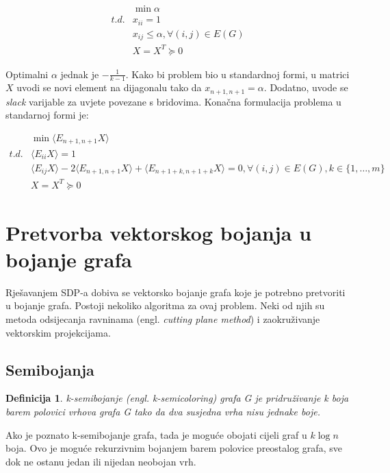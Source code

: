 \documentclass[diplomskirad]{fer}
\newtheorem{definicija}{Definicija}
\begin{document}
\begin{equation} \label{eq:color_notstandard}
  \begin{split}
    & \min \alpha \\
    t.d. & x_{ii} = 1 \\
         & x_{ij} \leq \alpha, \forall (i,j) \in E(G) \\
         & X=X^T \succeq 0 
  \end{split}
\end{equation}

Optimalni $\alpha$ jednak je $-\frac{1}{k-1}$. Kako bi problem bio u standardnoj formi, u matrici $X$ uvodi se novi element na dijagonalu tako da
$x_{n+1,n+1} = \alpha$. Dodatno, uvode se \textit{slack} varijable za uvjete povezane s bridovima. Konačna formulacija problema u standarnoj formi je: 


\begin{equation} \label{sdpbojanje}
  \begin{split}
    & \min \langle E_{n+1,n+1}X \rangle \\
    t.d. & \langle E_{ii}X \rangle = 1 \\
         & \langle E_{ij}X \rangle - 2 \langle E_{n+1,n+1}X \rangle + \langle E_{n+1+k,n+1+k}X \rangle = 0, \forall (i,j) \in E(G), k \in \{1,\dots,m\} \\
         & X=X^T \succeq 0 
  \end{split}
\end{equation}

\section{Pretvorba vektorskog bojanja u bojanje grafa}
Rješavanjem SDP-a dobiva se vektorsko bojanje grafa koje je potrebno pretvoriti u bojanje grafa. Postoji nekoliko algoritma za ovaj problem. Neki od njih su metoda odsijecanja ravninama 
(engl. \textit{cutting plane method}) i zaokruživanje vektorskim projekcijama.

\subsection{Semibojanja}
\begin{definicija}
  k-semibojanje (engl. \textit{k-semicoloring}) grafa G je pridruživanje k boja barem polovici vrhova grafa G tako da dva susjedna vrha nisu jednake boje. 
\end{definicija}

Ako je poznato k-semibojanje grafa, tada je moguće obojati cijeli graf u $k\log n$ boja. Ovo je moguće rekurzivnim bojanjem barem polovice preostalog grafa,
sve dok ne ostanu jedan ili nijedan neobojan vrh.
\end{document}
